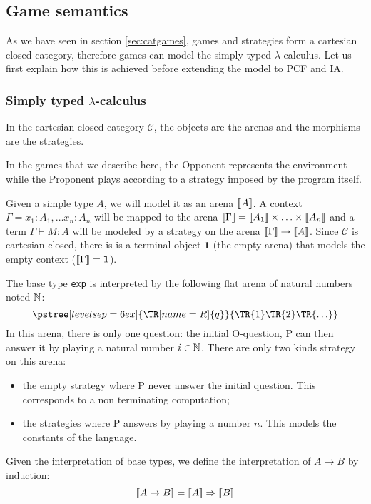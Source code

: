 \subsection{Game semantics}

As we have seen in section \ref{sec:catgames}, games and strategies
form a cartesian closed category, therefore games can model the simply-typed $\lambda$-calculus. Let us first
explain how this is achieved before extending the model to PCF and IA.

\subsubsection{Simply typed $\lambda$-calculus}

In the cartesian closed category $\mathcal{C}$, the objects are the arenas and the morphisms are the strategies.

In the games that we describe here, the Opponent represents the environment while
the Proponent plays according to a strategy imposed by the program itself.


Given a simple type $A$, we will model it as an arena ${[\![ A ]\!]}$.
A context $\Gamma = x_1 :A_1, \ldots x_n:A_n$ will be mapped to the arena
${[\![ \Gamma ]\!]} = {[\![ A_1 ]\!]} \times \ldots \times {[\![A_n ]\!]}$ and a term $\Gamma \vdash M : A$
will be modeled by a strategy on the arena ${[\![ \Gamma ]\!]} \rightarrow {[\![A ]\!]}$.
Since $\mathcal{C}$ is cartesian closed, there is is a terminal object $\textbf{1}$ (the empty arena) that
models the empty context (${[\![ \Gamma ]\!]} = \textbf{1}$).


The base type \texttt{exp} is interpreted by the following flat arena of natural numbers noted $\mathbb{N}$:
$$  \pstree[levelsep=6ex]
    {\TR[name=R]{q}}
    { \TR{1} \TR{2} \TR{\ldots}
    }
$$
In this arena, there is only one question: the initial O-question, P can then answer it by playing a natural number $i \in \mathbb{N}$.
There are only two kinds strategy on this arena:
\begin{itemize}
\item the empty strategy where P never answer the initial question. This corresponds to a non terminating computation;
\item the strategies where P answers by playing a number $n$. This models the constants of the language.
\end{itemize}

Given the interpretation of base types, we define the interpretation of $A\rightarrow B$ by induction:
$${[\![ A \rightarrow B ]\!]} = {[\![ A ]\!]} \Rightarrow {[\![B ]\!]}$$

